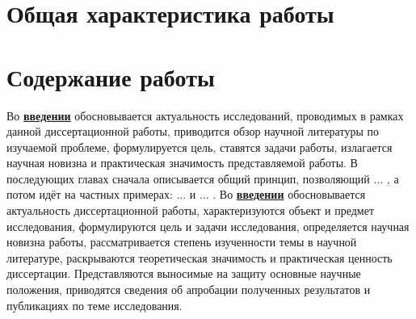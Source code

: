 
\section*{Общая характеристика работы}

\newcommand{\actuality}{\underline{\textbf{\actualityTXT}}}
\newcommand{\progress}{\underline{\textbf{\progressTXT}}}
\newcommand{\aim}{\underline{{\textbf\aimTXT}}}
\newcommand{\tasks}{\underline{\textbf{\tasksTXT}}}
\newcommand{\novelty}{\underline{\textbf{\noveltyTXT}}}
\newcommand{\influence}{\underline{\textbf{\influenceTXT}}}
\newcommand{\methods}{\underline{\textbf{\methodsTXT}}}
\newcommand{\defpositions}{\underline{\textbf{\defpositionsTXT}}}
\newcommand{\reliability}{\underline{\textbf{\reliabilityTXT}}}
\newcommand{\probation}{\underline{\textbf{\probationTXT}}}
\newcommand{\contribution}{\underline{\textbf{\contributionTXT}}}
\newcommand{\publications}{\underline{\textbf{\publicationsTXT}}}




\section*{Содержание работы}
Во \underline{\textbf{введении}} обосновывается актуальность
исследований, проводимых в рамках данной диссертационной работы,
приводится обзор научной литературы по изучаемой проблеме,
формулируется цель, ставятся задачи работы, излагается научная новизна
и практическая значимость представляемой работы. В последующих главах
сначала описывается общий принцип, позволяющий ... , а потом идёт
 на частных примерах: ...  и ... .
Во \underline{\textbf{введении}} обосновывается актуальность диссертационной работы, характеризуются объект и предмет исследования,  формулируются цель и задачи исследования, определяется научная новизна работы, рассматривается степень изученности темы в научной литературе, раскрываются теоретическая значимость и практическая ценность диссертации. Представляются выносимые на защиту основные научные положения, приводятся сведения об апробации полученных результатов и публикациях по теме исследования.



